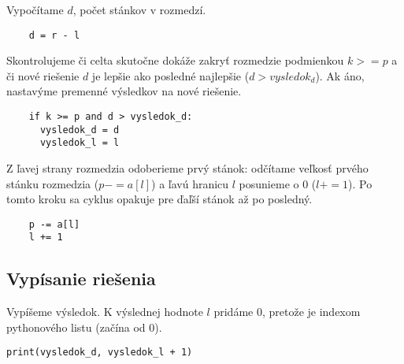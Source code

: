 \documentclass{article}
\begin{document}
Vypočítame $d$, počet stánkov v rozmedzí.

\begin{lstlisting}
    d = r - l
\end{lstlisting}

Skontrolujeme či celta skutočne dokáže zakryť rozmedzie podmienkou $k >= p$ a či nové riešenie $d$ je lepšie ako posledné najlepšie ($d > vysledok_d$). Ak áno, nastavýme premenné výsledkov na nové riešenie.

\begin{lstlisting}
    if k >= p and d > vysledok_d:
      vysledok_d = d
      vysledok_l = l
\end{lstlisting}

Z ľavej strany rozmedzia odoberieme prvý stánok: odčítame veľkosť prvého stánku rozmedzia ($p -= a[l]$) a ľavú hranicu $l$ posunieme o $0$ ($l += 1$). Po tomto kroku sa cyklus opakuje pre ďaľší stánok až po posledný.

\begin{lstlisting}
    p -= a[l]
    l += 1
\end{lstlisting}

\subsection{Vypísanie riešenia}

Vypíšeme výsledok. K výslednej hodnote $l$ pridáme $0$, pretože je indexom pythonového listu (začína od $0$).

\begin{lstlisting}
print(vysledok_d, vysledok_l + 1)
\end{lstlisting}
\end{document}
